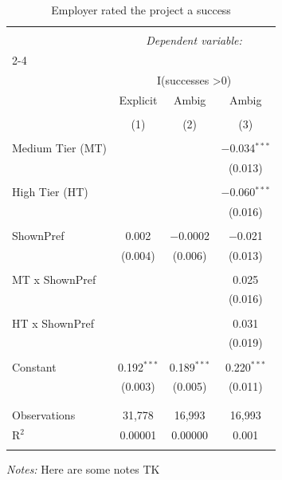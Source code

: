 
\begin{table}[!htbp] \centering 
  \caption{Employer rated the project a success} 
  \label{tab:success} 
\begin{tabular}{@{\extracolsep{5pt}}lccc} 
\\[-1.8ex]\hline 
\hline \\[-1.8ex] 
 & \multicolumn{3}{c}{\textit{Dependent variable:}} \\ 
\cline{2-4} 
\\[-1.8ex] & \multicolumn{3}{c}{I(successes \textgreater  0)} \\ 
 & Explicit & Ambig & Ambig \\ 
\\[-1.8ex] & (1) & (2) & (3)\\ 
\hline \\[-1.8ex] 
 Medium Tier (MT) &  &  & $-$0.034$^{***}$ \\ 
  &  &  & (0.013) \\ 
  & & & \\ 
 High Tier (HT) &  &  & $-$0.060$^{***}$ \\ 
  &  &  & (0.016) \\ 
  & & & \\ 
 ShownPref & 0.002 & $-$0.0002 & $-$0.021 \\ 
  & (0.004) & (0.006) & (0.013) \\ 
  & & & \\ 
 MT x ShownPref &  &  & 0.025 \\ 
  &  &  & (0.016) \\ 
  & & & \\ 
 HT x ShownPref &  &  & 0.031 \\ 
  &  &  & (0.019) \\ 
  & & & \\ 
 Constant & 0.192$^{***}$ & 0.189$^{***}$ & 0.220$^{***}$ \\ 
  & (0.003) & (0.005) & (0.011) \\ 
  & & & \\ 
\hline \\[-1.8ex] 
Observations & 31,778 & 16,993 & 16,993 \\ 
R$^{2}$ & 0.00001 & 0.00000 & 0.001 \\ 
\hline 
\hline \\[-1.8ex] 
\end{tabular}
\begin{minipage}{0.9\textwidth} 
 \emph{Notes:} Here are some notes TK
 \end{minipage}
\end{table}
